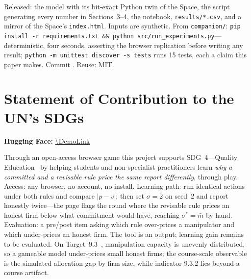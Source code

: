 \noindent Released: the model with its bit-exact Python twin of the Space, the
script generating every number in Sections~3--4, the notebook,
\texttt{results/*.csv}, and a mirror of the Space's \texttt{index.html}. Inputs
are synthetic. From \texttt{companion/}: \texttt{pip install -r
requirements.txt \&\& python src/run\_experiments.py}---deterministic, four
seconds, asserting the browser replication before writing any result;
\texttt{python -m unittest discover -s tests} runs 15 tests, each a claim this
paper makes. Commit \texttt{\CommitHash}. Reuse: MIT.

\section*{Statement of Contribution to the UN's SDGs}
\noindent\textbf{Hugging Face:} \url{\DemoLink}

\noindent Through an open-access browser game this project supports
SDG~4---Quality Education~\cite{un_sdg4} by helping students and non-specialist
practitioners learn \emph{why a committed and a revisable rule price the same
report differently}, through play. Access: any browser, no account, no install.
Learning path: run identical actions under both rules and compare $|p-v|$; then
set $\sigma=2$ on seed~2 and report honestly twice---the page flags the round
where the revisable rule prices an honest firm below what commitment would have,
reaching $\sigma^{*}=\bar m$ by hand. Evaluation: a pre/post item asking which
rule over-prices a manipulator and which under-prices an honest firm. The tool
is an output; learning gain remains to be evaluated. On Target~9.3~\cite{un2025,unga2015}, manipulation capacity is unevenly
distributed, so a gameable model under-prices small honest firms; the
course-scale observable is the simulated allocation gap by firm size, while
indicator 9.3.2 lies beyond a course artifact.
